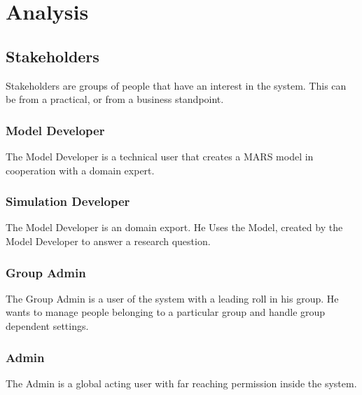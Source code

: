 
\chapter{Analysis}



\section{Stakeholders}
Stakeholders are groups of people that have an interest in the system. This can be from a practical, or from a business standpoint. 

\subsection{Model Developer}
The Model Developer is a technical user that creates a MARS model in cooperation with a domain expert.

\subsection{Simulation Developer}
The Model Developer is an domain export. He Uses the Model, created by the Model Developer to answer a research question.

\subsection{Group Admin}
The Group Admin is a user of the system with a leading roll in his group. He wants to manage people belonging to a particular group and handle group dependent settings.

\subsection{Admin}
The Admin is a global acting user with far reaching permission inside the system.

